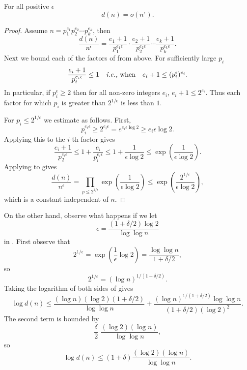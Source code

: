 \begin{proposition} \label{NT:Divisor:Est:Prop}
For all positive $\epsilon$
\[
d(n) = o(n^{\epsilon}).
\]
\end{proposition}

\begin{proof}
Assume $n = p_1^{e_1} p_2^{e_2} \cdots p_k^{e_k}$, then
\begin{equation}\label{Div:Est:Eqa}
\frac{d(n)}{n^{\epsilon}} = \frac{e_1 +1}{p_1^{e_1 \epsilon}} \cdot 
\frac{e_2 +1}{p_2^{e_2 \epsilon}} \cdots \frac{e_k +1}{p_k^{e_k
\epsilon}}.
\end{equation}
Next we bound each of the factors of  from above.
For sufficiently large $p_i$
\[
\frac{e_i +1}{p_i^{e_i \epsilon}} \le 1 \quad\mbox{{\em i.e.}, when} \quad
e_i + 1 \le (p_i^{\epsilon})^{e_i}.
\]
In particular, if $p_i^{\epsilon} \ge 2$ then for all non-zero
integers $e_i$, $e_i + 1 \le 2^{e_i}$.  Thus each factor for which
$p_i$ is greater than $2^{1/\epsilon}$ is less than $1$.

For $p_i \le 2^{1/\epsilon}$ we estimate as follows.  First, 
\[
p_i^{e_i \epsilon} \ge 2^{e_i \epsilon} = e^{e_i \epsilon \log 2}
\ge e_i \epsilon \log 2.
\]
Applying this to the $i$-th factor gives
\begin{equation}\label{Div:Est:Eqb}
\frac{e_i +1}{p_2^{e_i \epsilon}} \le 1 + \frac{e_i}{p_i^{e_i
\epsilon}}
\le 1 + \frac{1}{\epsilon \log 2} \le \exp (\frac{1}{\epsilon \log
2}).
\end{equation}
Applying  to  gives
\begin{equation} \label{DivisorFn:Bound:Eq}
\frac{d(n)}{n^{\epsilon}} =
 \prod_{p \le 2^{1/\epsilon}} \exp \left( \frac{1}{\epsilon \log 2}\right)
 \le \exp \left( \frac{2^{1/\epsilon}}{\epsilon \log 2}\right),
\end{equation}
which is a constant independent of $n$.
\end{proof}

On the other hand, observe what happens if we let 
\[
\epsilon = \frac{(1+ \delta/2) \log 2}{\log \log n}
\]
in .  First observe that
\[
2^{1/\epsilon} = \exp \left( \frac{1}{\epsilon} \log 2 \right)
  = \frac{\log \log n}{1 + \delta/2},
\]
so
\[
2^{1/\epsilon} = (\log n)^{1/(1+ \delta/2)}.
\]
Taking the logarithm of both sides of 
gives
\[
\log d(n) \le \frac{(\log n) (\log 2) (1 + \delta/2)}{\log \log n}
+ \frac{(\log n)^{1/(1+ \delta/2)} \log \log n}{(1+ \delta/2)(\log
2)^2}.
\]
The second term is bounded by
\[
\frac{\delta}{2}\,\, \frac{(\log 2) (\log n)}{\log \log n},
\]
so
\begin{equation} \label{DivisorUBound:Eq}
\log d(n) \le (1 + \delta) \frac{(\log 2)(\log n)}{\log \log n}.
\end{equation}


